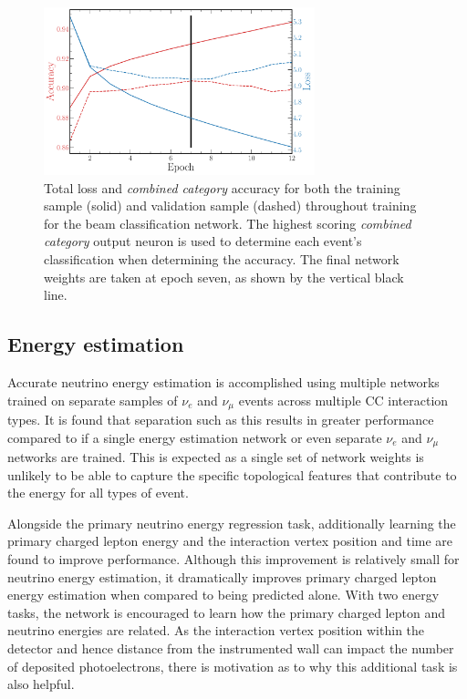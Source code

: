 \begin{figure} %
    \includegraphics[width=0.7\textwidth]{diagrams/7-results/final_beam_history.pdf}
    \caption[Loss and accuracy throughout training for the beam classification network]
    {Total loss and \emph{combined category} accuracy for both the training sample (solid) and
        validation sample (dashed) throughout training for the beam classification network. The
        highest scoring \emph{combined category} output neuron is used to determine each event's
        classification when determining the accuracy. The final network weights are taken at epoch
        seven, as shown by the vertical black line.}
    \label{fig:final_beam_history}
\end{figure}

\subsection{Energy estimation} %
\label{sec:cnn_specific_energy} %

Accurate neutrino energy estimation is accomplished using multiple networks trained on separate
samples of $\nu_{e}$ and $\nu_{\mu}$ events across multiple CC interaction types. It is found that
separation such as this results in greater performance compared to if a single energy estimation
network or even separate $\nu_{e}$ and $\nu_{\mu}$ networks are trained. This is expected as a
single set of network weights is unlikely to be able to capture the specific topological features
that contribute to the energy for all types of event.

Alongside the primary neutrino energy regression task, additionally learning the primary charged
lepton energy and the interaction vertex position and time are found to improve performance.
Although this improvement is relatively small for neutrino energy estimation, it dramatically
improves primary charged lepton energy estimation when compared to being predicted alone. With two
energy tasks, the network is encouraged to learn how the primary charged lepton and neutrino
energies are related. As the interaction vertex position within the detector and hence distance
from the instrumented wall can impact the number of deposited photoelectrons, there is motivation
as to why this additional task is also helpful.

